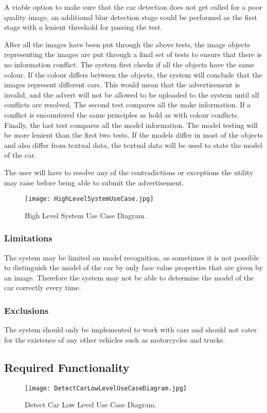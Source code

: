 A viable option to make sure that the car detection does not get called for a poor quality image, an additional blur detection stage could be performed as the first stage with a lenient threshold for passing the test.

After all the images have been put through the above tests, the image objects representing the images are  put through a final set of tests to ensure that there is no information conflict. The system first checks if all the objects have the same colour. If the colour differs between the objects, the system will conclude that the images represent different cars. This would mean that the advertisement is invalid, and the advert will not be allowed to be uploaded to the system until all conflicts are resolved. The second test compares all the make information. If a conflict is encountered the same principles as hold as with colour conflicts. Finally, the last test compares all the model information. The model testing will be more lenient than the first two tests. If the models differ in most of the objects and also differ from textual data, the textual data will be used to state the model of the car. 

The user will have to resolve any of the contradictions or exceptions the utility may raise before being able to submit the advertisement.
\pagebreak
\begin{figure}[h!]
  \caption{High Level System Use Case Diagram.}
  \centering
	\texttt{[image: HighLevelSystemUseCase.jpg]}
\end{figure}

\subsubsection{Limitations}
The system may be limited on model recognition, as sometimes it is not possible to distinguish the model of the car by only face value properties that are given by an image. Therefore the system may not be able to determine the model of the car correctly every time.

\subsubsection{Exclusions}
The system should only be implemented to work with cars and should not cater for the existence of any other vehicles such as motorcycles and trucks.

\subsection{Required Functionality}
\begin{figure}[h!]
  \caption{Detect Car Low Level Use Case Diagram.}
  \centering
	\texttt{[image: DetectCarLowLevelUseCaseDiagram.jpg]}
\end{figure}

